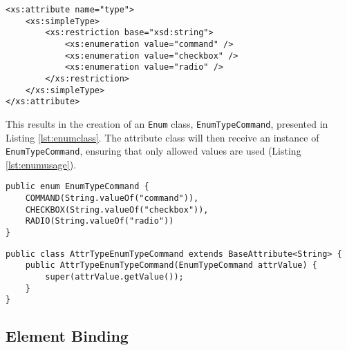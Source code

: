 \bigskip


\begin{minipage}{\linewidth}
\begin{lstlisting}[caption={Enumeration XSD Definition},label={lst:enumxsddefinition}]
<xs:attribute name="type">
    <xs:simpleType>
        <xs:restriction base="xsd:string">
            <xs:enumeration value="command" />
            <xs:enumeration value="checkbox" />
            <xs:enumeration value="radio" />
        </xs:restriction>
    </xs:simpleType>
</xs:attribute>
\end{lstlisting}
\end{minipage}

\noindent
This results in the creation of an \texttt{Enum} class, \texttt{EnumTypeCommand}, presented in Listing \ref{lst:enumclass}. The attribute class will then receive an instance of \texttt{EnumTypeCommand}, ensuring that only allowed values are used (Listing \ref{lst:enumusage}).

\bigskip


\begin{minipage}{\linewidth}
\begin{lstlisting}[caption={Enumeration Class},label={lst:enumclass}]
public enum EnumTypeCommand {
    COMMAND(String.valueOf("command")), 
    CHECKBOX(String.valueOf("checkbox")),
    RADIO(String.valueOf("radio"))
}
\end{lstlisting}
\end{minipage}


\begin{minipage}{\linewidth}
\begin{lstlisting}[caption={Attribute Receiving An Enumeration},label={lst:enumusage}]
public class AttrTypeEnumTypeCommand extends BaseAttribute<String> {
    public AttrTypeEnumTypeCommand(EnumTypeCommand attrValue) {
        super(attrValue.getValue());
    }
}
\end{lstlisting}
\end{minipage}

\newpage

\subsection{Element Binding}
\label{sec:elementbinding}

